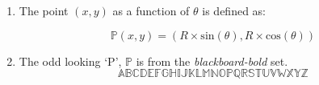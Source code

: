 \documentclass[a4paper,12pt]{article}
\begin{document}
\begin{enumerate}
\item	The point $(x,y)$ as a function of $\theta$ is defined as:

	\begin{equation}
		\mathbb{P}(x,y) = (R \times \mathrm{sin}(\theta),
			R \times \mathrm{cos}(\theta))
	\end{equation}
\item	The odd looking `P', $\mathbb{P}$ is from the {\em blackboard-bold} set.
	\begin{equation*}
		\mathbb{A B C D E F G H I J K L M N O P Q R S T U V W X Y Z}
	\end{equation*}
\end{enumerate}
\end{document}
